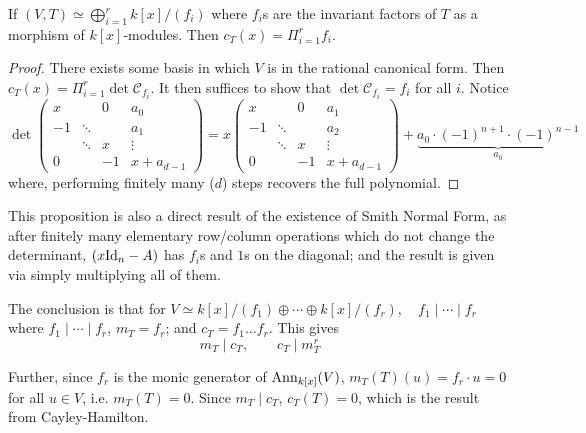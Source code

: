 \begin{proposition}
    If $(V, T) \simeq \bigoplus_{i=1}^r k[x]/(f_i)$ where $f_i$s are the invariant factors of $T$ as a morphism of $k[x]$-modules. Then $c_T(x) = \Pi_{i=1}^r f_i$. 
\end{proposition}

\begin{proof}
    There exists some basis in which $V$ is in the rational canonical form. Then $c_T(x) = \Pi_{i=1}^r \det \mathcal{C}_{f_i}$. It then suffices to show that $\det \mathcal{C}_{f_i} = f_i$ for all $i$. Notice
    \[
        \det \begin{pmatrix}
            x   &           & 0         & a_0    \\
            -1  & \ddots    &           & a_1    \\
                & \ddots    & x         & \vdots \\
            0   &           & -1        & x + a_{d-1}
        \end{pmatrix} = x\begin{pmatrix}
            x   &           & 0         & a_1    \\
            -1  & \ddots    &           & a_2    \\
                & \ddots    & x         & \vdots \\
            0   &           & -1        & x + a_{d-1}
        \end{pmatrix} + \underbrace{a_0 \cdot (-1)^{n+1} \cdot (-1)^{n-1}}_{a_0}
    \]
    where, performing finitely many ($d$) steps recovers the full polynomial. 
\end{proof}

\begin{remark}
    This proposition is also a direct result of the existence of Smith Normal Form, as after finitely many elementary row/column operations which do not change the determinant, $(x\mathrm{Id}_n - A)$ has $f_i$s and $1$s on the diagonal; and the result is given via simply multiplying all of them.
\end{remark}

The conclusion is that for $V \simeq k[x]/(f_1) \oplus \cdots \oplus k[x]/(f_r), \quad f_1 \mid \cdots \mid f_r$ where $f_1 \mid \cdots \mid f_r$, $m_T = f_r$; and $c_T = f_1 \ldots f_r$. This gives
\[
    m_T \mid c_T, \qquad c_T \mid m_T^{r}
\]

Further, since $f_r$ is the monic generator of $\mathrm{Ann}_{k[x]}(V)$, $m_T(T)(u) = f_r\cdot u = 0$ for all $u\in V$, i.e. $m_T(T) = 0$. Since $m_T \mid c_T$, $c_T(T) = 0$, which is the result from Cayley-Hamilton.

